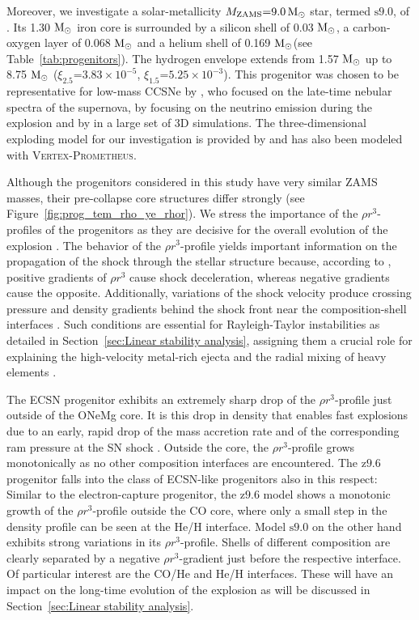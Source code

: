 \documentclass[fleqn,usenatbib]{mnras}
\newcommand{\solm}{\ensuremath{\rm{M_{\odot}}}\xspace}
\newcommand{\vertexprom}{\textsc{Vertex-Prometheus}\xspace}
\newcommand{\snine}{\ensuremath{\mathrm{s9.0}}\xspace}
\newcommand{\znine}{\ensuremath{\mathrm{z9.6}}\xspace}
\begin{document}
Moreover, we investigate a solar-metallicity $M_{\text{ZAMS}} \mathord{=} 9.0 \,\solm$ 
star, termed \snine, of \citet{Sukhbold2016}. Its 1.30 \solm iron core is 
surrounded by a silicon shell of 0.03 \solm, a carbon-oxygen layer of 0.068 
\solm and a helium shell of 0.169 \solm (see Table~\ref{tab:progenitors}). 
The hydrogen envelope extends from 1.57 \solm up to 8.75 \solm 
($\xi_{2.5}\mathord{=}3.83 \times 10^{-5}$, $\xi_{1.5}\mathord{=}5.25 \times 10^{-3}$).
This progenitor was chosen to be representative for low-mass CCSNe 
by \cite{Jerkstrand2018}, who focused on the late-time nebular spectra 
of the supernova, by \cite{Glas2019} focusing on the neutrino 
emission during the explosion and by \cite{Burrows2019} in a large set of 
3D simulations. The three-dimensional exploding model for 
our investigation is provided by \citet{Melson2019} and has also been 
modeled with \vertexprom. 

Although the progenitors considered in this study have very 
similar ZAMS masses, 
their pre-collapse core structures differ strongly 
(see Figure~\ref{fig:prog_tem_rho_ye_rhor}).
We stress the importance of the $\rho r^3$-profiles of the progenitors as 
they are decisive for the overall evolution of the explosion 
\citep{Kifonidis2003,Wongwathanarat2015}. 
The behavior of the $\rho r^3$-profile yields important information on 
the propagation of the shock through the stellar structure because, 
according to \cite{Sedov1961}, positive gradients of $\rho r^3$ cause 
shock deceleration, whereas negative gradients cause the opposite. 
Additionally, variations of the shock velocity produce crossing 
pressure and density gradients behind the shock front near the 
composition-shell interfaces \citep{Chevalier1978}. 
Such conditions are essential for 
Rayleigh-Taylor instabilities as detailed in 
Section~\ref{sec:Linear stability analysis}, assigning them a 
crucial role for explaining the high-velocity metal-rich ejecta 
and the radial mixing of heavy elements 
\citep{Arnett1989,Nomoto1990,Wongwathanarat2015}.

The ECSN progenitor exhibits an extremely sharp drop of the 
$\rho r^3$-profile just outside of the ONeMg core. It is this drop 
in density that enables fast explosions due to an early, rapid drop 
of the mass accretion rate and of the corresponding ram pressure at the 
SN shock \citep{Kitaura2006}. Outside the core, the $\rho r^3$-profile 
grows monotonically as no other composition interfaces are encountered.
The \znine progenitor falls into the class of ECSN-like progenitors also 
in this respect: Similar to the electron-capture progenitor, the \znine
model shows a monotonic growth of the $\rho r^3$-profile outside the CO 
core, where only a small step in the density profile can be seen at the 
He/H interface.
Model \snine on the other hand exhibits strong variations in its 
$\rho r^3$-profile. Shells of different composition are clearly separated 
by a negative $\rho r^3$-gradient just before the respective interface. Of 
particular interest are the CO/He and He/H interfaces. These will have an 
impact on the long-time evolution of the explosion as will be discussed 
in Section~\ref{sec:Linear stability analysis}.
\end{document}
